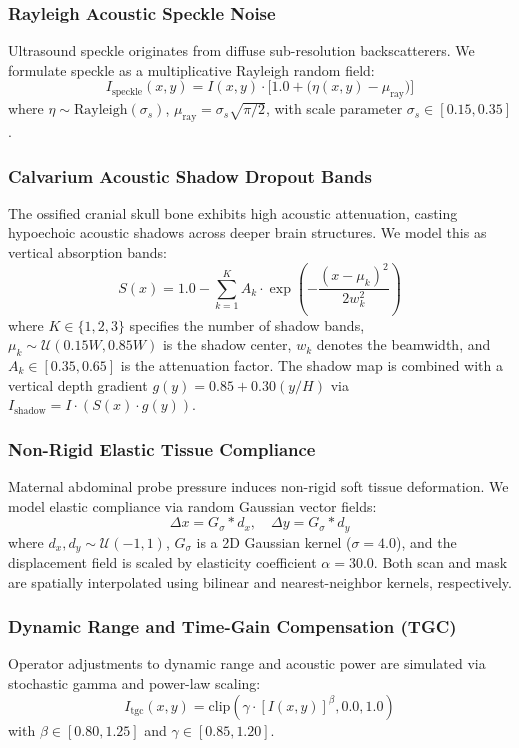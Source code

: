 \documentclass[conference]{IEEEtran}
\begin{document}
\subsubsection{Rayleigh Acoustic Speckle Noise}
Ultrasound speckle originates from diffuse sub-resolution backscatterers. We formulate speckle as a multiplicative Rayleigh random field:
\begin{equation}
    I_{\text{speckle}}(x, y) = I(x, y) \cdot \Big[1.0 + \big(\eta(x, y) - \mu_{\text{ray}}\big)\Big]
\end{equation}
where $\eta \sim \text{Rayleigh}(\sigma_s)$, $\mu_{\text{ray}} = \sigma_s \sqrt{\pi / 2}$, with scale parameter $\sigma_s \in [0.15, 0.35]$.

\subsubsection{Calvarium Acoustic Shadow Dropout Bands}
The ossified cranial skull bone exhibits high acoustic attenuation, casting hypoechoic acoustic shadows across deeper brain structures. We model this as vertical absorption bands:
\begin{equation}
    S(x) = 1.0 - \sum_{k=1}^K A_k \cdot \exp\left(-\frac{(x - \mu_k)^2}{2 w_k^2}\right)
\end{equation}
where $K \in \{1, 2, 3\}$ specifies the number of shadow bands, $\mu_k \sim \mathcal{U}(0.15 W, 0.85 W)$ is the shadow center, $w_k$ denotes the beamwidth, and $A_k \in [0.35, 0.65]$ is the attenuation factor. The shadow map is combined with a vertical depth gradient $g(y) = 0.85 + 0.30(y / H)$ via $I_{\text{shadow}} = I \cdot (S(x) \cdot g(y))$.

\subsubsection{Non-Rigid Elastic Tissue Compliance}
Maternal abdominal probe pressure induces non-rigid soft tissue deformation. We model elastic compliance via random Gaussian vector fields:
\begin{equation}
    \Delta x = G_\sigma * d_x, \quad \Delta y = G_\sigma * d_y
\end{equation}
where $d_x, d_y \sim \mathcal{U}(-1, 1)$, $G_\sigma$ is a 2D Gaussian kernel ($\sigma = 4.0$), and the displacement field is scaled by elasticity coefficient $\alpha = 30.0$. Both scan and mask are spatially interpolated using bilinear and nearest-neighbor kernels, respectively.

\subsubsection{Dynamic Range and Time-Gain Compensation (TGC)}
Operator adjustments to dynamic range and acoustic power are simulated via stochastic gamma and power-law scaling:
\begin{equation}
    I_{\text{tgc}}(x, y) = \mathrm{clip}\left( \gamma \cdot [I(x, y)]^\beta, 0.0, 1.0 \right)
\end{equation}
with $\beta \in [0.80, 1.25]$ and $\gamma \in [0.85, 1.20]$.
\end{document}
